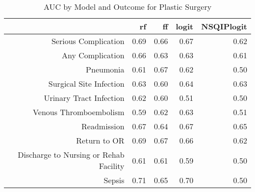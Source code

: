 \begin{table}[ht]
\centering
\begin{tabular}{rrrrr}
  \hline
 & rf & ff & logit & NSQIPlogit \\ 
  \hline
Serious Complication & 0.69 & 0.66 & 0.67 & 0.62 \\ 
  Any Complication & 0.66 & 0.63 & 0.63 & 0.61 \\ 
  Pneumonia & 0.61 & 0.67 & 0.62 & 0.50 \\ 
  Surgical Site Infection & 0.63 & 0.60 & 0.64 & 0.63 \\ 
  Urinary Tract Infection & 0.62 & 0.60 & 0.51 & 0.50 \\ 
  Venous Thromboembolism & 0.59 & 0.62 & 0.63 & 0.51 \\ 
  Readmission & 0.67 & 0.64 & 0.67 & 0.65 \\ 
  Return to OR & 0.69 & 0.67 & 0.66 & 0.62 \\ 
  Discharge to Nursing or Rehab Facility & 0.61 & 0.61 & 0.59 & 0.50 \\ 
  Sepsis & 0.71 & 0.65 & 0.70 & 0.50 \\ 
   \hline
\end{tabular}
\caption{AUC by Model and Outcome for Plastic Surgery} 
\end{table}
